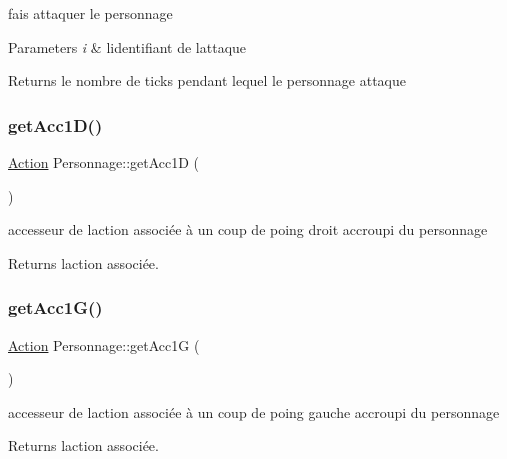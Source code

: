 fais attaquer le personnage 


\begin{DoxyParams}{Parameters}
{\em i} & l\textquotesingle{}identifiant de l\textquotesingle{}attaque \\
\hline
\end{DoxyParams}
\begin{DoxyReturn}{Returns}
le nombre de ticks pendant lequel le personnage attaque 
\end{DoxyReturn}
\mbox{\label{class_personnage_ad556b91118a0d444c69e6bf0083f2f3d}} 
\subsubsection{\texorpdfstring{get\+Acc1\+D()}{getAcc1D()}}
{\footnotesize\ttfamily \hyperlink{class_action}{Action} Personnage\+::get\+Acc1D (\begin{DoxyParamCaption}{ }\end{DoxyParamCaption})}



accesseur de l\textquotesingle{}action associée à un coup de poing droit accroupi du personnage 

\begin{DoxyReturn}{Returns}
l\textquotesingle{}action associée. 
\end{DoxyReturn}
\mbox{\label{class_personnage_abddbd853934d7bdf5f12f78d3b9c03e1}} 
\subsubsection{\texorpdfstring{get\+Acc1\+G()}{getAcc1G()}}
{\footnotesize\ttfamily \hyperlink{class_action}{Action} Personnage\+::get\+Acc1G (\begin{DoxyParamCaption}{ }\end{DoxyParamCaption})}



accesseur de l\textquotesingle{}action associée à un coup de poing gauche accroupi du personnage 

\begin{DoxyReturn}{Returns}
l\textquotesingle{}action associée. 
\end{DoxyReturn}
\mbox{\label{class_personnage_aa57428d84c280ebbbfd3d39de64607cd}} 
